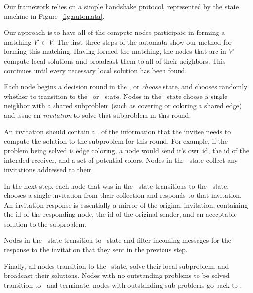 \label{sec:automata}
Our framework relies on a simple handshake protocol, represented by the state machine in Figure~\ref{fig:automata}.

Our approach is to have all of the compute nodes participate in forming a matching $V' \subset V$. The first three steps of the automata show our method for forming this matching. Having formed the matching, the nodes that are in $V'$ compute local solutions and broadcast them to all of their neighbors. This continues until every necessary local solution has been found. 


Each node begins a decision round in the \cCd, or {\em choose} state, and chooses randomly whether to transition to the \cId\ or \cLd\ state. Nodes in the \cId\ state choose a single neighbor with a shared subproblem (such as covering or coloring a shared edge) and issue an {\em invitation} to solve that subproblem in this round. 

An invitation should contain all of the information that the invitee needs to compute the solution to the subproblem for this round. For example, if the problem being solved is edge coloring, a node would send it's own id, the id of the intended receiver, and a set of potential colors. Nodes in the \cLd\ state collect any invitations addressed to them. 

In the next step, each node that was in the \cLd\ state transitions to the \cRd\ state, chooses a single invitation from their collection and responds to that invitation. An invitation response is essentially a mirror of the original invitation, containing the id of the responding node, the id of the original sender, and an acceptable solution to the subproblem. 

Nodes in the \cId\ state transition to \cWd\ state and filter incoming messages for the response to the invitation that they sent in the previous step. 

Finally, all nodes transition to the \cUd\ state, solve their local subproblem, and broadcast their solutions. Nodes with no outstanding problems to be solved transition to \cDd\ and terminate, nodes with outstanding sub-problems go back to \cCd.
